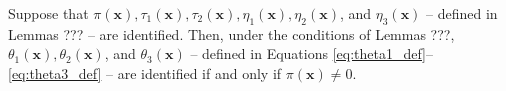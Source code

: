 

\begin{cor}
  \label{cor:theta_ident}
  Suppose that $\pi(\mathbf{x}), \tau_1(\mathbf{x}), \tau_2(\mathbf{x}),  \eta_1(\mathbf{x}), \eta_2(\mathbf{x})$, and $\eta_3(\mathbf{x})$ -- defined in Lemmas ??? -- are identified.
  Then, under the conditions of Lemmas ???, $\theta_1(\mathbf{x}), \theta_2(\mathbf{x})$, and $\theta_3(\mathbf{x})$ -- defined in Equations \ref{eq:theta1_def}--\ref{eq:theta3_def} -- are identified if and only if $\pi(\mathbf{x}) \neq 0$.
\end{cor}


\begin{thm}
  \label{thm:main_ident}
\end{thm}
